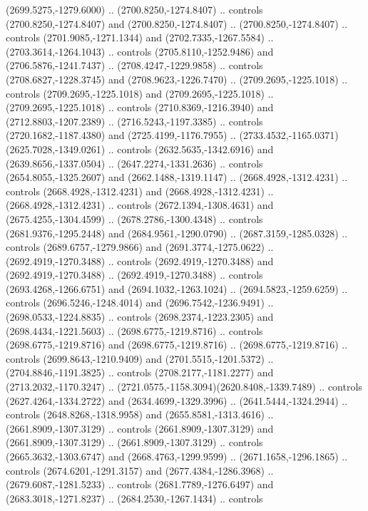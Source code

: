 \begin{scope}[shift={(28.3138,-376.6591)}]
\begin{scope}[shift={(-2186.6262,1813.8454)}]
      (2699.5275,-1279.6000) .. (2700.8250,-1274.8407) .. controls
      (2700.8250,-1274.8407) and (2700.8250,-1274.8407) .. (2700.8250,-1274.8407) ..
      controls (2701.9085,-1271.1344) and (2702.7335,-1267.5584) ..
      (2703.3614,-1264.1043) .. controls (2705.8110,-1252.9486) and
      (2706.5876,-1241.7437) .. (2708.4247,-1229.9858) .. controls
      (2708.6827,-1228.3745) and (2708.9623,-1226.7470) .. (2709.2695,-1225.1018) ..
      controls (2709.2695,-1225.1018) and (2709.2695,-1225.1018) ..
      (2709.2695,-1225.1018) .. controls (2710.8369,-1216.3940) and
      (2712.8803,-1207.2389) .. (2716.5243,-1197.3385) .. controls
      (2720.1682,-1187.4380) and (2725.4199,-1176.7955) ..
      (2733.4532,-1165.0371)(2625.7028,-1349.0261) .. controls
      (2632.5635,-1342.6916) and (2639.8656,-1337.0504) .. (2647.2274,-1331.2636) ..
      controls (2654.8055,-1325.2607) and (2662.1488,-1319.1147) ..
      (2668.4928,-1312.4231) .. controls (2668.4928,-1312.4231) and
      (2668.4928,-1312.4231) .. (2668.4928,-1312.4231) .. controls
      (2672.1394,-1308.4631) and (2675.4255,-1304.4599) .. (2678.2786,-1300.4348) ..
      controls (2681.9376,-1295.2448) and (2684.9561,-1290.0790) ..
      (2687.3159,-1285.0328) .. controls (2689.6757,-1279.9866) and
      (2691.3774,-1275.0622) .. (2692.4919,-1270.3488) .. controls
      (2692.4919,-1270.3488) and (2692.4919,-1270.3488) .. (2692.4919,-1270.3488) ..
      controls (2693.4268,-1266.6751) and (2694.1032,-1263.1024) ..
      (2694.5823,-1259.6259) .. controls (2696.5246,-1248.4014) and
      (2696.7542,-1236.9491) .. (2698.0533,-1224.8835) .. controls
      (2698.2374,-1223.2305) and (2698.4434,-1221.5603) .. (2698.6775,-1219.8716) ..
      controls (2698.6775,-1219.8716) and (2698.6775,-1219.8716) ..
      (2698.6775,-1219.8716) .. controls (2699.8643,-1210.9409) and
      (2701.5515,-1201.5372) .. (2704.8846,-1191.3825) .. controls
      (2708.2177,-1181.2277) and (2713.2032,-1170.3247) ..
      (2721.0575,-1158.3094)(2620.8408,-1339.7489) .. controls
      (2627.4264,-1334.2722) and (2634.4699,-1329.3996) .. (2641.5444,-1324.2944) ..
      controls (2648.8268,-1318.9958) and (2655.8581,-1313.4616) ..
      (2661.8909,-1307.3129) .. controls (2661.8909,-1307.3129) and
      (2661.8909,-1307.3129) .. (2661.8909,-1307.3129) .. controls
      (2665.3632,-1303.6747) and (2668.4763,-1299.9599) .. (2671.1658,-1296.1865) ..
      controls (2674.6201,-1291.3157) and (2677.4384,-1286.3968) ..
      (2679.6087,-1281.5233) .. controls (2681.7789,-1276.6497) and
      (2683.3018,-1271.8237) .. (2684.2530,-1267.1434) .. controls

\end{scope}
\end{scope}
